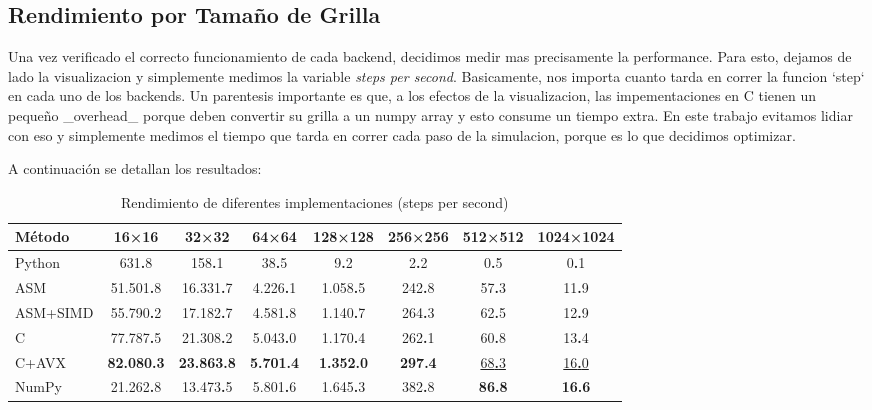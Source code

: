 \documentclass[a4paper]{article}
\begin{document}
\subsection{Rendimiento por Tamaño de Grilla}
Una vez verificado el correcto funcionamiento de cada backend, decidimos medir mas precisamente la performance. Para esto, dejamos de lado la visualizacion y simplemente
medimos la variable \textit{steps per second}. Basicamente, nos importa cuanto tarda en correr la funcion `step` en cada uno de los backends. Un parentesis importante es
que, a los efectos de la visualizacion, las impementaciones en C tienen un pequeño _overhead_ porque deben convertir su grilla a un numpy array y esto consume un tiempo extra.
En este trabajo evitamos lidiar con eso y simplemente medimos el tiempo que tarda en correr cada paso de la simulacion, porque es lo que decidimos optimizar.

A continuación se detallan los resultados:

\begin{table}[h]
    \centering
    \caption{Rendimiento de diferentes implementaciones (steps per second)}
    \label{tab:performance_results}
    \begin{tabular}{lccccccc}
        \toprule
        \textbf{Método} & \textbf{16×16}             & \textbf{32×32}             & \textbf{64×64}            & \textbf{128×128}          & \textbf{256×256}        & \textbf{512×512}          & \textbf{1024×1024}        \\
        \midrule
        Python          & 631\textbf{.}8             & 158\textbf{.}1             & 38\textbf{.}5             & 9\textbf{.}2              & 2\textbf{.}2            & 0\textbf{.}5              & 0\textbf{.}1              \\
        ASM             & 51.501\textbf{.}8          & 16.331\textbf{.}7          & 4.226\textbf{.}1          & 1.058\textbf{.}5          & 242\textbf{.}8          & 57\textbf{.}3             & 11\textbf{.}9             \\
        ASM+SIMD        & 55.790\textbf{.}2          & 17.182\textbf{.}7          & 4.581\textbf{.}8          & 1.140\textbf{.}7          & 264\textbf{.}3          & 62\textbf{.}5             & 12\textbf{.}9             \\
        C               & 77.787\textbf{.}5          & 21.308\textbf{.}2          & 5.043\textbf{.}0          & 1.170\textbf{.}4          & 262\textbf{.}1          & 60\textbf{.}8             & 13\textbf{.}4             \\
        C+AVX           & \textbf{82.080\textbf{.}3} & \textbf{23.863\textbf{.}8} & \textbf{5.701\textbf{.}4} & \textbf{1.352\textbf{.}0} & \textbf{297\textbf{.}4} & \underline{68\textbf{.}3} & \underline{16\textbf{.}0} \\
        NumPy           & 21.262\textbf{.}8          & 13.473\textbf{.}5          & 5.801\textbf{.}6          & 1.645\textbf{.}3          & 382\textbf{.}8          & \textbf{86\textbf{.}8}    & \textbf{16\textbf{.}6}    \\
        \bottomrule
    \end{tabular}
\end{table}
\end{document}
